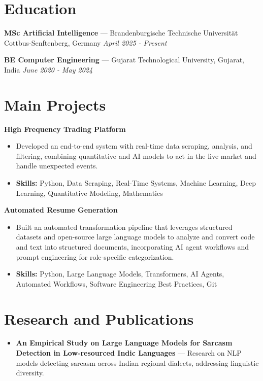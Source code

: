\documentclass[a4paper,10pt]{article}
\begin{document}
\section*{Education}
\textbf{MSc Artificial Intelligence} — Brandenburgische Technische Universität Cottbus-Senftenberg, Germany \hfill \textit{April 2025 - Present}\par
\vspace{1.5pt}
\textbf{BE Computer Engineering} — Gujarat Technological University, Gujarat, India \hfill \textit{June 2020 - May 2024}\par

\section*{Main Projects}
\textbf{High Frequency Trading Platform}\par
\vspace{1pt}
\begin{itemize}
  \item Developed an end-to-end system with real-time data scraping, analysis, and filtering, combining quantitative and AI models to act in the live market and handle unexpected events.
  \item \textbf{Skills:} Python, Data Scraping, Real-Time Systems, Machine Learning, Deep Learning, Quantitative Modeling, Mathematics
\end{itemize}
\vspace{3pt}
\textbf{Automated Resume Generation}\par
\vspace{1pt}
\begin{itemize}
  \item Built an automated transformation pipeline that leverages structured datasets and open-source large language models to analyze and convert code and text into structured documents, incorporating AI agent workflows and prompt engineering for role-specific categorization.
  \item \textbf{Skills:} Python, Large Language Models, Transformers, AI Agents, Automated Workflows, Software Engineering Best Practices, Git
\end{itemize}

\section*{Research and Publications}
\begin{itemize}
\item \textbf{An Empirical Study on Large Language Models for Sarcasm Detection in Low-resourced Indic Languages} — Research on NLP models detecting sarcasm across Indian regional dialects, addressing linguistic diversity.
\end{itemize}
\end{document}
